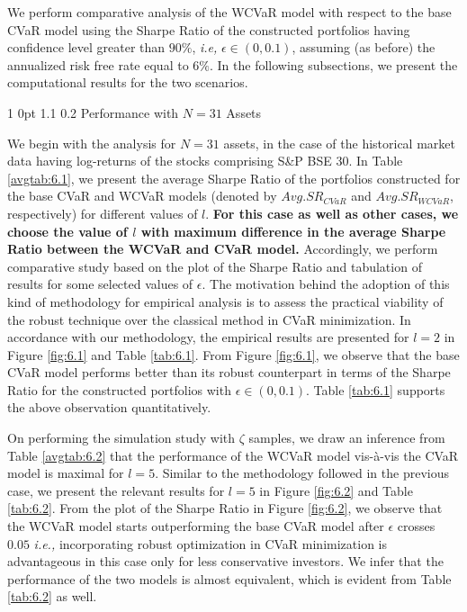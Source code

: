 \documentclass[12pt]{article}
\makeatletter
\numberwithin{equation}{section}
\renewcommand{\subsubsection}{
  \@startsection
  {subsubsection}%
  {1}%
  {0pt}%
  {1.1\baselineskip}%
  {0.2\baselineskip}%
  {\sc \centering}%
}
\makeatother
\begin{document}
We perform comparative analysis of the WCVaR model with respect to the base CVaR model using the Sharpe Ratio of the constructed portfolios having confidence level greater than $90\%$, \textit{i.e,} $\epsilon \in (0,0.1)$, assuming (as before) the annualized risk free rate equal to $6\%$. In the following subsections, we present the computational results for the two scenarios.

\subsubsection{Performance with $N=31$ Assets}

We begin with the analysis for $N=31$ assets, in the case of the historical market data having log-returns of the stocks comprising S\&P BSE 30. In Table \ref{avgtab:6.1}, we present the average Sharpe Ratio of the portfolios constructed for the base CVaR and WCVaR models (denoted by $Avg. SR_{CVaR}$ and 
$Avg. SR_{WCVaR}$, respectively) for different values of $l$. \textbf{For this case as well as other cases, we choose the value of $l$ with maximum difference in the average Sharpe Ratio between the WCVaR and CVaR model.} Accordingly, we perform comparative study based on the plot of the Sharpe Ratio and tabulation of results for some selected values of $\epsilon$. The motivation behind the adoption of this kind of methodology for empirical analysis is to assess the practical viability of the robust technique over the classical method in CVaR minimization. In accordance with our methodology, the empirical results are presented for $l=2$ in Figure \ref{fig:6.1} and Table \ref{tab:6.1}. From Figure \ref{fig:6.1}, we observe that the base CVaR model performs better than its robust counterpart in terms of the Sharpe Ratio for the constructed portfolios with $\epsilon \in (0,0.1)$. Table \ref{tab:6.1} supports the above observation quantitatively.

On performing the simulation study with $\zeta$ samples, we draw an inference from Table \ref{avgtab:6.2} that the performance of the WCVaR model vis-\`a-vis the CVaR model is maximal for $l=5$. Similar to the methodology followed in the previous case, we present the relevant results for $l=5$ in Figure \ref{fig:6.2} and Table \ref{tab:6.2}. From the plot of the Sharpe Ratio in Figure \ref{fig:6.2}, we observe that the WCVaR model starts outperforming the base CVaR model after $\epsilon$ crosses $0.05$ \textit{i.e.,} incorporating robust optimization in CVaR minimization is advantageous in this case only for less conservative investors. We infer that the performance of the two models is almost equivalent, which is evident from Table \ref{tab:6.2} as well.
\end{document}

